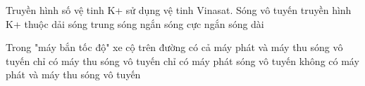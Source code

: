 \begin{ex} %
Truyền hình số vệ tinh K+ sử dụng vệ tinh Vinasat. Sóng vô tuyến truyền hình K+ thuộc dải
\choice
{sóng trung}
{sóng ngắn}
{\True sóng cực ngắn}
{sóng dài}
\end{ex} 

\begin{ex} %
Trong "máy bắn tốc độ" xe cộ trên đường
\choice
{\True có cả máy phát và máy thu sóng vô tuyến}
{chỉ có máy thu sóng vô tuyến}
{chỉ có máy phát sóng vô tuyến}
{không có máy phát và máy thu sóng vô tuyến}
\end{ex} 


























